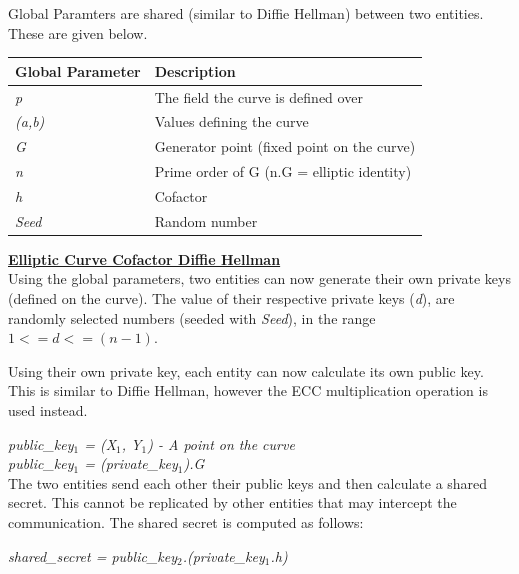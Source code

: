\documentclass[bsc,frontabs,twoside,singlespacing,parskip,deptreport]{infthesis}     %
\begin{document}
Global Paramters are shared (similar to Diffie Hellman) between two entities. These are given below.
\begin{table}[H]
\begin{tabular}{|l|l|}
\hline
Global Parameter & Description\\
\hline
\textit{p} & The field the curve is defined over\\
\hline
\textit{(a,b)} & Values defining the curve\\
\hline
\textit{G} & Generator point (fixed point on the curve)\\
\hline
\textit{n} & Prime order of G (n.G = elliptic identity)\\
\hline
\textit{h} & Cofactor\\
\hline
\textit{Seed} & Random number\\
\hline
\end{tabular}
\end{table}

\underline{\textbf{Elliptic Curve Cofactor Diffie Hellman}}\\

Using the global parameters, two entities can now generate their own private keys (defined on the curve). The value of their respective private keys (\textit{d}), are randomly selected numbers (seeded with \textit{Seed}), in the range $ 1 <= d <= (n-1)$.

Using their own private key, each entity can now calculate its own public key. This is similar to Diffie Hellman, however the ECC multiplication operation is used instead.

\textit{public\_key$_1$ = (X$_1$, Y$_1$) - A point on the curve}\\
\textit{public\_key$_1$ = (private\_key$_1$).G}\\

The two entities send each other their public keys and then calculate a shared secret. This cannot be replicated by other entities that may intercept the communication. The shared secret is computed as follows:
\begin{center}
\textit{shared\_secret = public\_key$_2$.(private\_key$_1$.h)}
\end{center}
\end{document}

